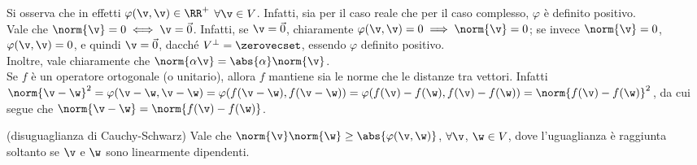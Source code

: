 \documentclass[11pt]{article}
\begin{document}
	\begin{remark}\nl
		\li Si osserva che in effetti $\varphi(\v, \v) \in \RR^+$ $\forall \v \in V$. Infatti, sia
		per il caso reale che per il caso complesso, $\varphi$ è definito positivo. \\
		\li Vale che $\norm{\v} = 0 \iff \v = \vec 0$. Infatti, se $\v = \vec 0$, chiaramente
		$\varphi(\v, \v) = 0 \implies \norm{\v} = 0$; se invece $\norm{\v} = 0$,
		$\varphi(\v, \v) = 0$, e quindi $\v = \vec 0$, dacché $V^\perp = \zerovecset$, essendo
		$\varphi$ definito positivo. \\
		\li Inoltre, vale chiaramente che $\norm{\alpha \v} = \abs{\alpha} \norm{\v}$. \\
		\li Se $f$ è un operatore ortogonale (o unitario), allora $f$ mantiene sia le
		norme che le distanze tra vettori. Infatti $\norm{\v - \w}^2 = \varphi(\v - \w, \v - \w) =
		\varphi(f(\v - \w), f(\v - \w)) = \varphi(f(\v) - f(\w), f(\v) - f(\w)) = \norm{f(\v) - f(\w)}^2$,
		da cui segue che $\norm{\v - \w} = \norm{f(\v) - f(\w)}$.
	\end{remark}

	\begin{proposition} (disuguaglianza di Cauchy-Schwarz)
		Vale che $\norm{\v} \norm{\w} \geq \abs{\varphi(\v, \w)}$, $\forall \v$, $\w \in V$, dove
		l'uguaglianza è raggiunta soltanto se $\v$ e $\w$ sono linearmente dipendenti.
	\end{proposition}
\end{document}
